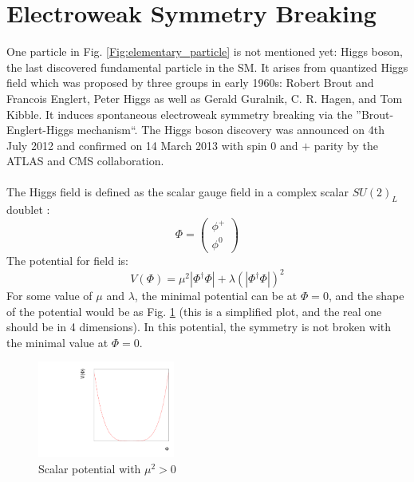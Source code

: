 \section{Electroweak Symmetry Breaking}
One particle in Fig. \ref{Fig:elementary_particle} is not mentioned yet: Higgs boson, the last discovered fundamental particle in the SM. It arises from quantized Higgs field which was proposed by three groups in early 1960s:  Robert Brout and Francois Englert\cite{Englert}, Peter Higgs\cite{Higgs} as well as Gerald Guralnik, C. R. Hagen, and Tom Kibble\cite{Hagen}. It induces spontaneous electroweak symmetry breaking via the ''Brout-Englert-Higgs mechanism``.  The Higgs boson discovery was announced on 4th July 2012 and confirmed on 14 March 2013 with spin 0 and $+$ parity by the ATLAS and CMS collaboration.
\\
\\The Higgs field is defined as the scalar gauge field in a complex scalar $SU(2)_L$ doublet :
\begin{equation}
 \Phi= \left(  \begin{array}{ c } \phi^+\\  \phi^0 \end{array} \right) 
\end{equation}
The potential for field is:
\begin{equation}
 V(\Phi)=\mu^2|\Phi^\dagger\Phi|+\lambda(|\Phi^\dagger\Phi|)^2
\label{Eq:sm_higgs_potential}
\end{equation}
For some value of $\mu$ and $\lambda$, the minimal potential can be at $\Phi = 0$, and the shape of the potential would be as Fig. \ref{Fig:V} (this is a simplified plot, and the real one should be in 4 dimensions). In this potential, the symmetry is not broken with the minimal value at $\Phi = 0$.
\\ 
\begin{figure}[!h]                
	\includegraphics[width=0.4\textwidth]{Chapter1/V.pdf}
	\centering
	\begin{center}
		\caption{Scalar potential with $\mu^2 > 0$}
		\label{Fig:V}            
	\end{center}
\end{figure}
